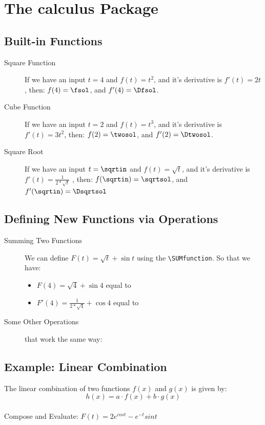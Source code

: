 \documentclass{article}
\begin{document}
	\pagebreak
	
	\section{The calculus Package}
	
	\subsection{Built-in Functions}
	\begin{description}
		\item[Square Function]
			If we have an input $t=4$ and $f(t)=t^2$, 
			and it's derivative is $f'(t)=2t$, then:
			$f(4)=\fsol$, and $f'(4)=\Dfsol$.
		\newcommand{\two}{2}
		\item[Cube Function]	
			If we have an input $t=2$ and $f(t)=t^3$, 
			and it's derivative is $f'(t)=3t^2$, then:
			\CUBEfunction{\two}{\twosol}{\Dtwosol}
			$f(2)=\twosol$, and $f'(2)=\Dtwosol$.
		\item[Square Root]
			If we have an input $t=\sqrtin$ 
			and $f(t)=\sqrt{t}$, and it's derivative is
			$f'(t)=\frac{1}{2*\sqrt{t}}$ , then:
			\SQRTfunction{\sqrtin}{\sqrtsol}{\Dsqrtsol}
			$f(\sqrtin)=\sqrtsol$, 
			and $f'(\sqrtin)=\Dsqrtsol$
	\end{description}
	
	\subsection{Defining New Functions via Operations}
	\begin{description}
		\item[Summing Two Functions]
			We can define $F(t)=\sqrt{t} + \sin t$ using 
			the \verb|\SUMfunction|.
		   \SUMfunction{\SQRTfunction}{\SINfunction}{\F}
		   So that we have: 
		   \begin{itemize}
		   		\item $F(4) = \sqrt{4} + \sin 4$ 
		   			equal to ~\Fsol
		   		\item $F'(4)= \frac{1}{2*\sqrt{4}} + 							\cos 4$ equal to \DFsol
		   \end{itemize}
		\item[Some Other Operations] that work the same
		 	way:
		 	
	\end{description}
	
	\subsection{Example: Linear Combination}
	The linear combination of two functions $f(x)$ and
	 $g(x)$ is given by: \\
	 \[ h(x) = a \cdot f(x) + b \cdot g(x) \]
	 \noindent\\[5pt]
	 Compose and Evaluate:
	 $F(t) = 2e^{cos t} - e^{-t}sin t$ 
	\COMPOSITIONfunction{\EXPfunction}{\COSfunction}				{\FunOne}
	
\end{document}
